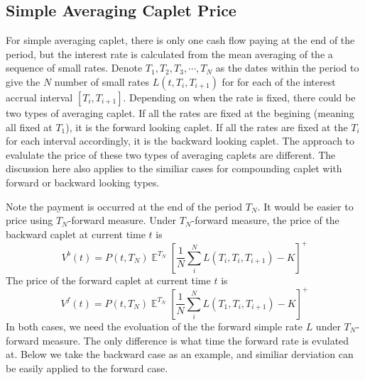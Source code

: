 \documentclass[12pt]{article}
\DeclareMathOperator{\E}{\mathbb{E}}
\begin{document}
\subsection{Simple Averaging Caplet Price}
For simple averaging caplet, there is only one cash flow
paying at the end of the period, but the interest rate is 
calculated from the mean averaging of the a sequence of small
rates. Denote $T_1, T_2, T_3, \cdots, T_N$
as the dates within the period to give the $N$
number of small rates $L(t, T_i, T_{i+1})$ for 
for each of the interest accrual interval $[T_i, T_{i+1}]$.
Depending on when the rate is fixed, there could be 
two types of averaging caplet. If all the rates are
fixed at the begining (meaning all fixed at $T_1$),
it is the forward looking caplet. If all the rates
are fixed at the $T_i$ for each interval accordingly,
it is the backward looking caplet. The approach to
evalulate the price of these two types of averaging
caplets are different. The discussion here also applies
to the similiar cases for compounding caplet with forward or
backward looking types.

Note the payment is occurred at the end of the period
$T_N$. It would be easier to price using $T_N$-forward
measure.
Under $T_N$-forward measure, the price of the
backward caplet at current time $t$ is 
\begin{equation}
    V^{b}(t) = P(t, T_N) \E^{T_N} \left[
        \frac{1}{N} \sum_{i}^{N} L(T_i, T_i, T_{i+1}) - K
    \right]^+
\end{equation}
The price of the forward caplet at current time $t$ is 
\begin{equation}
    V^{f}(t) = P(t, T_N) \E^{T_N} \left[
        \frac{1}{N} \sum_{i}^{N} L(T_1, T_i, T_{i+1}) - K
    \right]^+
\end{equation}
{\color{red} In both cases, we need the evoluation of the the forward
simple rate $L$ under $T_N$-forward measure.} The only difference is what time the forward
rate is evulated at. Below we take the backward case as an 
example, and similiar derviation can be easily applied to the
forward case.
\end{document}

